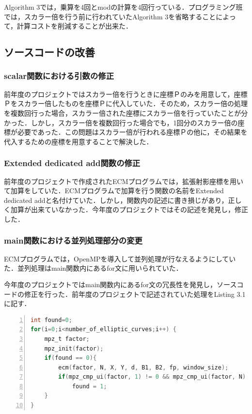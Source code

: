 \documentclass[openany,11pt,papersize]{jsbook}
\begin{document}
Algorithm 3では，乗算を4回とmodの計算を4回行っている．プログラミング班では，スカラー倍を行う前に行われていたAlgorithm 3を省略することによって，計算コストを削減することが出来た．


\subsection{ソースコードの改善}\label{sec:alg2}
\subsubsection{scalar関数における引数の修正}

前年度のプロジェクトではスカラー倍を行うときに座標Ｐのみを用意して，座標Ｐをスカラー倍したものを座標Ｐに代入していた．そのため，スカラー倍の処理を複数回行った場合，スカラー倍された座標にスカラー倍を行っていたことが分かった．しかし，スカラー倍を複数回行った場合でも，1回分のスカラー倍の座標が必要であった．この問題はスカラー倍が行われる座標Ｐの他に，その結果を代入するための座標を用意することで解決した．

\subsubsection{Extended dedicated add関数の修正}

前年度のプロジェクトで作成されたECMプログラムでは，拡張射影座標を用いて加算をしていた．ECMプログラムで加算を行う関数の名前をExtended dedicated addと名付けていた．しかし，関数内の記述に書き損じがあり，正しく加算が出来ていなかった．今年度のプロジェクトではその記述を発見し，修正した．

\subsubsection{main関数における並列処理部分の変更}

ECMプログラムでは，OpenMPを導入して並列処理が行なえるようにしていた．並列処理はmain関数内にあるfor文に用いられていた．

今年度のプロジェクトではmain関数内にあるfor文の冗長性を発見し，ソースコードの修正を行った．前年度のプロジェクトで記述されていた処理をListing 3.1に記す．

{\footnotesize
\begin{lstlisting}[language=c, frame=single, numbers=left, caption=前年度の並列処理, numbersep=10pt,extendedchars=true, xleftmargin=17pt, framexleftmargin=17pt]
int found=0; 
for(i=0;i<number_of_elliptic_curves;i++) {
	mpz_t factor;
	mpz_init(factor);
	if(found == 0){
		ecm(factor, N, X, Y, d, B1, B2, fp, window_size);　
		if(mpz_cmp_ui(factor, 1) != 0 && mpz_cmp_ui(factor, N) != 0)
			found = 1;
	}	
}
 \end{lstlisting}
}
\vspace{0.2in}
\end{document}

